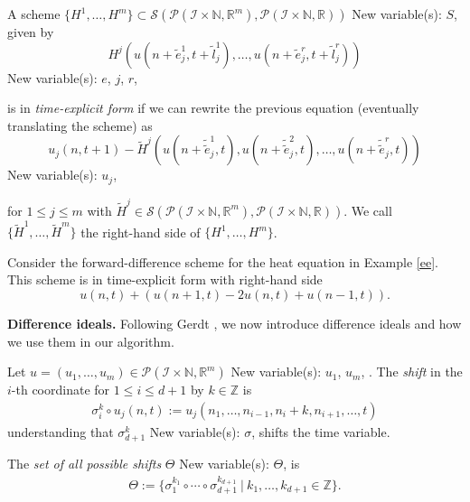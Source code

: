 \documentclass[runningheads]{llncs}
\newcommand{\1}{\chi}
\begin{document}
\begin{definition}
	A scheme \(\{H^1,\ldots,H^m\}\subset\mathcal{S}(\mathcal{P}(\mathcal{I}\times\mathbb{N},\mathbb{R}^m),\mathcal{P}(\mathcal{I}\times\mathbb{N},\mathbb{R}))\)
{\color{blue} New variable(s): \(S\),  }
 given by
	\begin{equation*}
		H^j(u(n+\tilde{e}_j^1,t+\tilde{l}_j^1),\ldots,u(n+\tilde{e}_j^r,t+\tilde{l}_j^r))
	\end{equation*}
{\color{blue} New variable(s): \(e\), \(j\), \(r\),  }

	is in \emph{time-explicit form} if we can rewrite the previous equation (eventually translating the scheme) as
	\begin{equation*}
		u_j(n,t+1)-\tilde{H}^j(u(n+\tilde{\tilde{e}}_j^1,t),u(n+\tilde{\tilde{e}}_j^2,t),\ldots,u(n+\tilde{\tilde{e}}_j^r,t))
	\end{equation*}
{\color{blue} New variable(s): \(u_j\),  }

	for \(1\leq j\leq m\)
	with \(\tilde{H}^j\in\mathcal{S}(\mathcal{P}(\mathcal{I}\times\mathbb{N},\mathbb{R}^m),\mathcal{P}(\mathcal{I}\times\mathbb{N},\mathbb{R}))\). We call \(\{\tilde{H}^1,\ldots,\tilde{H}^m\}\) the right-hand side of \(\{H^1,\ldots,H^m\}\).
\end{definition}
\begin{example}\label{timeexplicitheateq}
	Consider the forward-difference scheme for the heat equation in Example \ref{ee}. 
	This scheme is in time-explicit form with right-hand side
	\begin{equation*}
		u(n,t)+(u(n+1,t)-2u(n,t)+u(n-1,t)).
	\end{equation*}
\end{example}
{\bf Difference ideals.}\label{diffid}
Following Gerdt \cite{gerdt12}, we now introduce difference ideals and how we use them in our algorithm.
\begin{definition}
	Let \(u=(u_1,\dots,u_m)\in\mathcal{P}(\mathcal{I}\times\mathbb{N},\mathbb{R}^m)\)
{\color{blue} New variable(s): \(u_1\), \(u_m\),  }
. The \emph{shift} in the \(i\)-th coordinate for \(1\leq i\leq d+1\) by \(k\in{\mathbb{Z}}\) is
	\begin{gather*}
		\sigma_i^k\circ u_j(n,t):=u_j(n_1,\ldots,n_{i-1},n_i+k,n_{i+1},\ldots,t)
	\end{gather*}
	understanding that \(\sigma_{d+1}^k\)
{\color{blue} New variable(s): \(\sigma\),  }
 shifts the time variable.
\end{definition}
\begin{definition}
	The \emph{set of all possible shifts} \(\Theta\)
{\color{blue} New variable(s): \(\Theta\),  }
 is
	\begin{gather*}
		\Theta:=\{\sigma_1^{k_1}\circ\cdots\circ\sigma_{d+1}^{k_{d+1}}\ |\ k_1,\ldots,k_{d+1}\in{\mathbb{Z}}\}.
	\end{gather*}
\end{definition}
\end{document}

